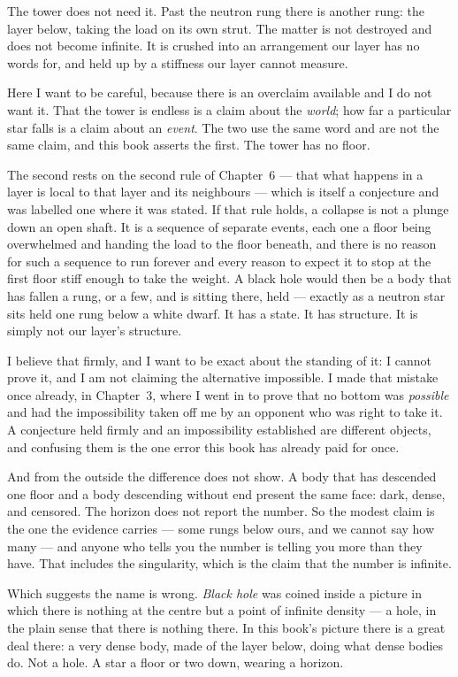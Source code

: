 The tower does not need it. Past the neutron rung there is another rung: the layer below, taking the load on its own strut. The matter is not destroyed and does not become infinite. It is crushed into an arrangement our layer has no words for, and held up by a stiffness our layer cannot measure.

Here I want to be careful, because there is an overclaim available and I do not want it. That the tower is endless is a claim about the \emph{world}; how far a particular star falls is a claim about an \emph{event}. The two use the same word and are not the same claim, and this book asserts the first. The tower has no floor.

The second rests on the second rule of Chapter~6 --- that what happens in a layer is local to that layer and its neighbours --- which is itself a conjecture and was labelled one where it was stated. If that rule holds, a collapse is not a plunge down an open shaft. It is a sequence of separate events, each one a floor being overwhelmed and handing the load to the floor beneath, and there is no reason for such a sequence to run forever and every reason to expect it to stop at the first floor stiff enough to take the weight. A black hole would then be a body that has fallen a rung, or a few, and is sitting there, held --- exactly as a neutron star sits held one rung below a white dwarf. It has a state. It has structure. It is simply not our layer's structure.

I believe that firmly, and I want to be exact about the standing of it: I cannot prove it, and I am not claiming the alternative impossible. I made that mistake once already, in Chapter~3, where I went in to prove that no bottom was \emph{possible} and had the impossibility taken off me by an opponent who was right to take it. A conjecture held firmly and an impossibility established are different objects, and confusing them is the one error this book has already paid for once.

And from the outside the difference does not show. A body that has descended one floor and a body descending without end present the same face: dark, dense, and censored. The horizon does not report the number. So the modest claim is the one the evidence carries --- some rungs below ours, and we cannot say how many --- and anyone who tells you the number is telling you more than they have. That includes the singularity, which is the claim that the number is infinite.

Which suggests the name is wrong. \emph{Black hole} was coined inside a picture in which there is nothing at the centre but a point of infinite density --- a hole, in the plain sense that there is nothing there. In this book's picture there is a great deal there: a very dense body, made of the layer below, doing what dense bodies do. Not a hole. A star a floor or two down, wearing a horizon.

